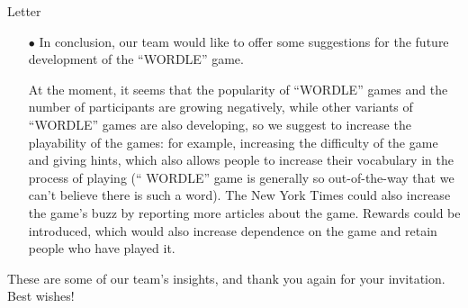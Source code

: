 \documentclass[12pt]{article}  %
\begin{document}
\begin{letter}{Letter}
{{\begin{enumerate}[0]
\item[$\bullet$] In conclusion, our team would like to offer some suggestions for the future development of the ``WORDLE'' game.

At the moment, it seems that the popularity of ``WORDLE'' games and the number of participants are growing negatively, while other variants of ``WORDLE'' games are also developing, so we suggest to increase the playability of the games: for example, increasing the difficulty of the game and giving hints, which also allows people to increase their vocabulary in the process of playing (`` WORDLE'' game is generally so out-of-the-way that we can't believe there is such a word). The New York Times could also increase the game's buzz by reporting more articles about the game. Rewards could be introduced, which would also increase dependence on the game and retain people who have played it.
\end{enumerate}}
}
These are some of our team's insights, and thank you again for your invitation. Best wishes!
\end{letter}








\end{document}
